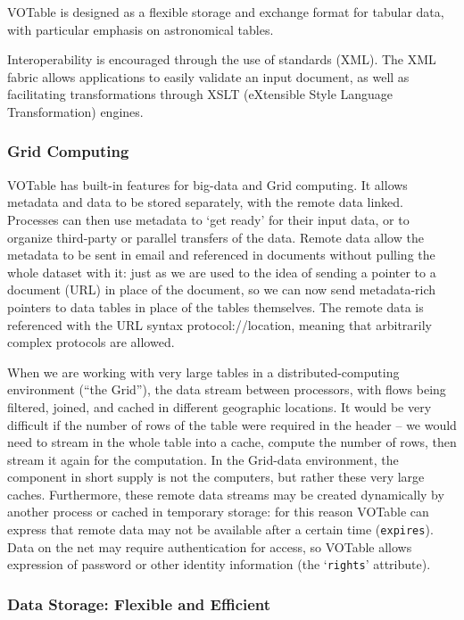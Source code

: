 \documentclass[11pt,a4paper]{ivoa}
\let\fg=\color
\def\attr#1{{\tt{\fg{DarkRed}#1}}}
\begin{document}
VOTable is designed as a flexible storage and exchange format for
tabular data, with particular emphasis on astronomical tables.

Interoperability is encouraged through the use of standards (XML).
The XML fabric
allows applications to easily validate an input document, as well as
facilitating transformations through XSLT (eXtensible Style Language
Transformation) engines.

\subsubsection*{Grid Computing}

VOTable has built-in features for big-data and Grid computing. It
allows metadata and data to be stored separately, with the remote
data linked. %
Processes can then use
metadata to `get ready' for their input data, or to organize
third-party or parallel transfers of the data. Remote data allow the
metadata to be sent in email and referenced in documents without
pulling the whole dataset with it: just as we are used to the idea of
sending a pointer to a document (URL) in place of the document, so we
can now send metadata-rich pointers to data tables in place of the
tables themselves. The remote data is referenced with the URL syntax
\textsf{protocol://location},
meaning that arbitrarily complex protocols are allowed.

When we are working with very large tables in a
distributed-computing environment (``the Grid''), the data
stream between processors, with flows being filtered, joined, and
cached in different geographic locations. It would be very difficult
if the number of rows of the table were required in the header --
we would need to stream in the whole table into a cache, compute the
number of rows, then stream it again for the computation. In the
Grid-data environment, the component in short supply is not the
computers, but rather these very large caches. Furthermore, these
remote data streams may be created dynamically by another process or
cached in temporary storage: for this reason VOTable can express that
remote data may not be available after a certain time (\attr{expires}).
Data on the net may require authentication for access, so VOTable
allows expression of password or other identity information (the
`{\attr{rights}}'
attribute).

\subsubsection*{Data Storage: Flexible and Efficient}
\end{document}
